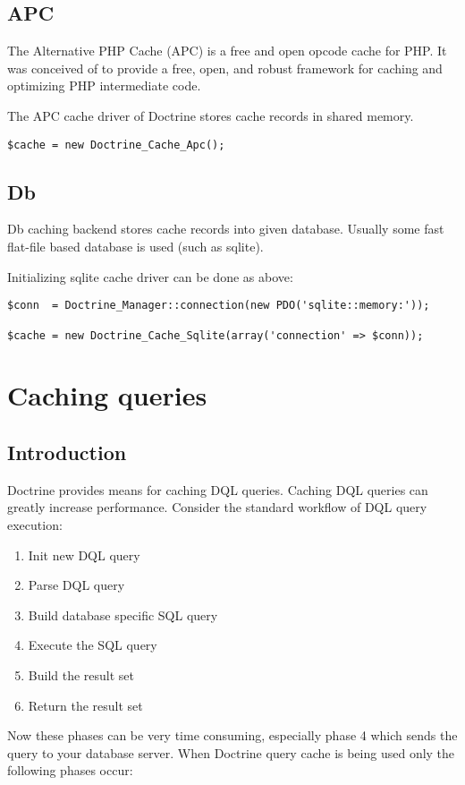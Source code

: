 \documentclass[11pt,a4paper]{report}
\begin{document}
\subsection{APC}
The Alternative PHP Cache (APC) is a free and open opcode cache for PHP. It was conceived of to provide a free, open, and robust framework for caching and optimizing PHP intermediate code.

The APC cache driver of Doctrine stores cache records in shared memory.

\begin{verbatim}
$cache = new Doctrine_Cache_Apc();
\end{verbatim}

\subsection{Db}
Db caching backend stores cache records into given database. Usually some fast flat-file based database is used (such as sqlite).

Initializing sqlite cache driver can be done as above:

\begin{verbatim}
$conn  = Doctrine_Manager::connection(new PDO('sqlite::memory:'));

$cache = new Doctrine_Cache_Sqlite(array('connection' => $conn));
\end{verbatim}

\section{Caching queries}
\subsection{Introduction}
Doctrine provides means for caching DQL queries. Caching DQL queries can greatly increase performance. Consider the standard workflow of DQL query execution:

\renewcommand{\labelenumi}{\arabic{enumi}}
\begin{enumerate}
\item{Init new DQL query}
\item{Parse DQL query}
\item{Build database specific SQL query}
\item{Execute the SQL query}
\item{Build the result set}
\item{Return the result set}
\end{enumerate}
Now these phases can be very time consuming, especially phase 4 which sends the query to your database server. When Doctrine query cache is being used only the following phases occur:
\end{document}
